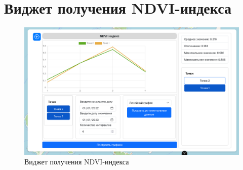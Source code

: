 \chapter{Виджет получения NDVI-индекса}
\label{cha:cloud}

\begin{figure}[h]  %
	\centering
	\includegraphics[height=0.6\textwidth]{imgs/ndvi.png}  %
	\caption{Виджет получения NDVI-индекса}  %
	\label{fig:ndvi}  %
\end{figure}

